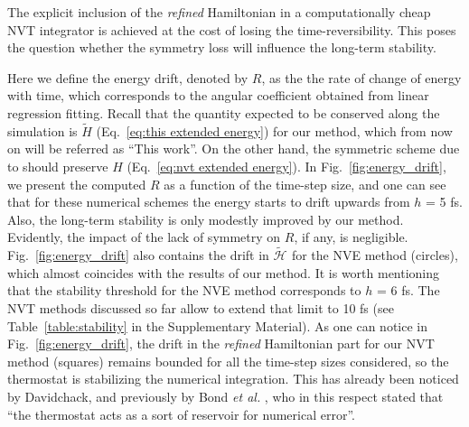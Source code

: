 \documentclass[
journal=jctcce,
layout=twocolumn
]{achemso}
\newcommand{\Ham}[1]{{\mathcal H}_\text{#1}}    %
\newcommand{\refined}[1]{\widetilde{#1}}
\begin{document}
The explicit inclusion of the \textit{refined} Hamiltonian in a computationally cheap NVT integrator is achieved at the cost of losing the time-reversibility.
This poses the question whether the symmetry loss will influence the long-term stability.

Here we define the energy drift, denoted by $R$, as the the rate of change of energy with time, which corresponds to the angular coefficient obtained from linear regression fitting.
Recall that the quantity expected to be conserved along the simulation is $\widetilde{H}$ (Eq.~\ref{eq:this extended energy}) for our method, which from now on will be referred as ``This work''.
On the other hand, the symmetric scheme due to \citeauthor{Martyna_1996} \cite{Martyna_1996} should preserve $H$ (Eq.~\ref{eq:nvt extended energy}).
In Fig.~\ref{fig:energy_drift}, we present the computed $R$ as a function of the time-step size, and one can see that for these numerical schemes the energy starts to drift upwards from $h$ = 5 fs. 
Also, the long-term stability is only modestly improved by our method. Evidently, the impact of the lack of symmetry on $R$, if any, is negligible.
Fig.~\ref{fig:energy_drift} also contains the drift in $\refined{\Ham{}}$ for the NVE method \cite{Silveira_2017} (circles), which almost coincides with the results of our method. It is worth mentioning that the stability threshold for the NVE method corresponds to $h$ = 6 fs.
The NVT methods discussed so far allow to extend that limit to 10 fs (see Table~\ref{table:stability} in the Supplementary Material). As one can notice in Fig.~\ref{fig:energy_drift}, the drift in the \textit{refined} Hamiltonian part for our NVT method (squares) remains bounded for all the time-step sizes considered, so the thermostat is stabilizing the numerical integration.
This has already been noticed by Davidchack\cite{Davidchack_2009}, and previously by Bond \textit{et al.} \cite{Bond_2007}, who in this respect stated that ``the thermostat acts as a sort of reservoir for numerical error''.
\end{document}
